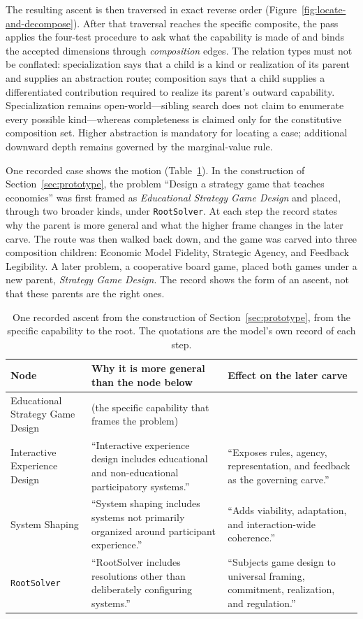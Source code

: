 \documentclass[11pt]{article}
\let\oldtexttt\texttt
\renewcommand{\texttt}[1]{\oldtexttt{\small #1}}
\begin{document}
The resulting ascent is then traversed in exact reverse order (Figure~\ref{fig:locate-and-decompose}). After that traversal reaches the specific composite, the pass applies the four-test procedure to ask what the capability is made of and binds the accepted dimensions through \emph{composition} edges. The relation types must not be conflated: specialization says that a child is a kind or realization of its parent and supplies an abstraction route; composition says that a child supplies a differentiated contribution required to realize its parent's outward capability. Specialization remains open-world---sibling search does not claim to enumerate every possible kind---whereas completeness is claimed only for the constitutive composition set. Higher abstraction is mandatory for locating a case; additional downward depth remains governed by the marginal-value rule.

One recorded case shows the motion (Table~\ref{tab:ascent-record}). In the construction of Section~\ref{sec:prototype}, the problem ``Design a strategy game that teaches economics'' was first framed as \emph{Educational Strategy Game Design} and placed, through two broader kinds, under \texttt{RootSolver}. At each step the record states why the parent is more general and what the higher frame changes in the later carve. The route was then walked back down, and the game was carved into three composition children: Economic Model Fidelity, Strategic Agency, and Feedback Legibility. A later problem, a cooperative board game, placed both games under a new parent, \emph{Strategy Game Design}. The record shows the form of an ascent, not that these parents are the right ones.

\begin{table}[H]
\centering
\small
\caption{One recorded ascent from the construction of Section~\ref{sec:prototype}, from the specific capability to the root. The quotations are the model's own record of each step.}
\label{tab:ascent-record}
\begin{tabular}{@{}>{\raggedright\arraybackslash}p{3.3cm}>{\raggedright\arraybackslash}p{5.9cm}>{\raggedright\arraybackslash}p{5.3cm}@{}}
\toprule
\textbf{Node} & \textbf{Why it is more general than the node below} & \textbf{Effect on the later carve} \\
\midrule
Educational Strategy Game Design & (the specific capability that frames the problem) & \\
Interactive Experience Design & ``Interactive experience design includes educational and non-educational participatory systems.'' & ``Exposes rules, agency, representation, and feedback as the governing carve.'' \\
System Shaping & ``System shaping includes systems not primarily organized around participant experience.'' & ``Adds viability, adaptation, and interaction-wide coherence.'' \\
\texttt{RootSolver} & ``RootSolver includes resolutions other than deliberately configuring systems.'' & ``Subjects game design to universal framing, commitment, realization, and regulation.'' \\
\bottomrule
\end{tabular}
\end{table}
\end{document}
